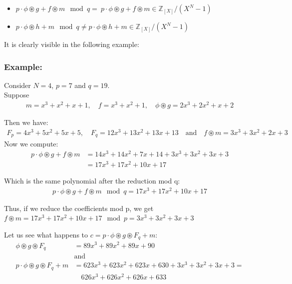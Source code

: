 \begin{itemize}
    \item $p \cdot \phi \circledast g + f \circledast m \mod q =\ p \cdot \phi \circledast g + f \circledast m \in \mathbb{Z}_{[X]}/(X^N - 1)$
    \item $p \cdot \phi \circledast h + m \mod q \neq p \cdot \phi \circledast h + m \in \mathbb{Z}_{[X]}/(X^N - 1)$
\end{itemize}

\noindent
It is clearly visible in the following example:

\subsubsection*{Example:}
Consider $N = 4$, $p = 7$ and $q = 19$.\\
Suppose 
\begin{align*}
    m = x^3 + x^2 + x + 1, \quad f = x^3 + x^2 + 1, \quad \phi \circledast g = 2x^3 + 2x^2+x+2
\end{align*}
\medskip

\noindent
Then we have:
\begin{align*}
    F_p = 4x^3+5x^2+5x+5, \quad F_q = 12x^3+13x^2+13x+13 \quad \text{and} \quad f\circledast m = 3x^3 + 3x^2 + 2x + 3
\end{align*}
\noindent
Now we compute:
\begin{align*}
    p \cdot \phi \circledast g + f \circledast m
    &= 14x^3 + 14x^2 + 7x + 14+3x^3 + 3x^2 + 3x + 3 \\
    &= 17x^3 + 17x^2 + 10x + 17
\end{align*}

\noindent
Which is the same polynomial after the reduction mod q:
\begin{align*}
    p \cdot \phi \circledast g + f \circledast m \mod q = 17x^3 + 17x^2 + 10x + 17
\end{align*}

\noindent
Thus, if we reduce the coefficients mod p, we get $f \circledast m= 17x^3 + 17x^2 + 10x + 17 \mod p = 3x^3 + 3x^2 + 3x + 3$
\vspace{1 cm}

\noindent
Let us see what happens to $c = p \cdot \phi \circledast g \circledast F_q + m:$
\begin{align*}
    \phi \circledast g \circledast F_q &= 89x^3 + 89x^2 + 89x + 90\\
    &\text{and}\\
    p \cdot \phi \circledast g \circledast F_q + m &= 623x^3 + 623x^2 + 623x + 630 + 3x^3 + 3x^2 + 3x + 3 = \\
    &\quad 626x^3 + 626x^2 + 626x + 633
\end{align*}

